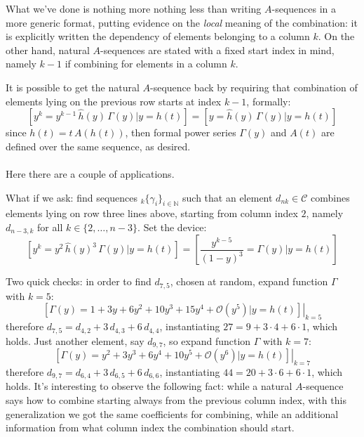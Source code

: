 What we've done is nothing more nothing less than writing $A$-sequences 
in a more generic format, putting evidence on the \emph{local} meaning 
of the combination: it is explicitly written the dependency of 
elements belonging to a column $k$. On the other hand, natural $A$-sequences 
are stated with a fixed start index in mind, namely $k-1$ if combining 
for elements in a column $k$.

It is possible to get the natural $A$-sequence back by requiring that 
combination of elements lying on the previous row starts at index $k-1$, formally:
\begin{displaymath}
    \left[y^{k} = y^{k-1}\,\hat{h}(y)\,\Gamma(y) \big| y = h(t) \right] = 
    \left[y = \hat{h}(y)\,\Gamma(y) \big| y = h(t) \right]
\end{displaymath}
since $h(t) = t\,A(h(t))$, then formal power series 
$\Gamma(y)$ and $A(t)$ are defined over the same sequence, as desired.
\\\\
Here there are a couple of applications. 

What if we ask: find sequences $_{k}\lbrace \gamma_{i} \rbrace_{i\in\mathbb{N}}$ 
such that an element $d_{nk}\in\mathcal{C}$ combines elements lying on 
row three lines above, starting from column index $2$, 
namely $d_{n-3,k}$ for all $k\in\lbrace 2,\ldots,n-3\rbrace$. 
Set the device:
\begin{displaymath}
    \left[y^{k} = y^{2}\,\hat{h}(y)^3\,\Gamma(y) \big| y = h(t) \right] =
        \left[\frac{y^{k-5}}{(1-y)^3} = \Gamma(y) \big| y = h(t) \right]
\end{displaymath}

Two quick checks: in order to find $d_{7,5}$, chosen at random, 
expand function $\Gamma$ with $k=5$:
\begin{displaymath}
    \left.\left[\Gamma(y)=1 + 3y + 6y^2 + 10y^3 + 15y^4 + \mathcal{O}(y^5) 
        \big| y = h(t) \right]\right|_{k=5}
\end{displaymath}
therefore $d_{7,5}=d_{4,2} + 3\,d_{4,3} + 6\,d_{4,4}$, 
instantiating $27 = 9 + 3\cdot4 + 6\cdot1$, which holds.
Just another element, say $d_{9,7}$, so expand function $\Gamma$ with $k=7$:
\begin{displaymath}
    \left.\left[\Gamma(y)=y^2 + 3y^3 + 6y^4 + 10y^5 +  \mathcal{O}(y^6) 
        \big| y = h(t) \right]\right|_{k=7}
\end{displaymath}
therefore $d_{9,7}=d_{6,4} + 3\,d_{6,5} + 6\,d_{6,6}$, 
instantiating $44 = 20 + 3\cdot6 + 6\cdot1$, which holds.
It's interesting to observe the following fact: while a natural $A$-sequence
says how to combine starting always from the previous column index, with
this generalization we got the same coefficients for combining, while
an additional information from what column index the combination should start.

